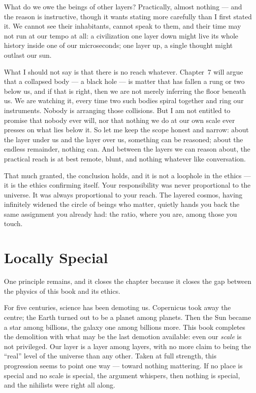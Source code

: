 \documentclass[fontsize=11pt,paper=a4,pagesize=auto,parskip=half-]{scrbook}
\begin{document}
What do we owe the beings of other layers? Practically, almost nothing --- and the reason is instructive, though it wants stating more carefully than I first stated it. We cannot see their inhabitants, cannot speak to them, and their time may not run at our tempo at all: a civilization one layer down might live its whole history inside one of our microseconds; one layer up, a single thought might outlast our sun.

What I should not say is that there is no reach whatever. Chapter~7 will argue that a collapsed body --- a black hole --- is matter that has fallen a rung or two below us, and if that is right, then we are not merely inferring the floor beneath us. We are watching it, every time two such bodies spiral together and ring our instruments. Nobody is arranging those collisions. But I am not entitled to promise that nobody ever will, nor that nothing we do at our own scale ever presses on what lies below it. So let me keep the scope honest and narrow: about the layer under us and the layer over us, something can be reasoned; about the endless remainder, nothing can. And between the layers we can reason about, the practical reach is at best remote, blunt, and nothing whatever like conversation.

That much granted, the conclusion holds, and it is not a loophole in the ethics --- it is the ethics confirming itself. Your responsibility was never proportional to the universe. It was always proportional to your reach. The layered cosmos, having infinitely widened the circle of beings who matter, quietly hands you back the same assignment you already had: the ratio, where you are, among those you touch.

\section{Locally Special}

One principle remains, and it closes the chapter because it closes the gap between the physics of this book and its ethics.

For five centuries, science has been demoting us. Copernicus took away the centre; the Earth turned out to be a planet among planets. Then the Sun became a star among billions, the galaxy one among billions more. This book completes the demolition with what may be the last demotion available: even our \emph{scale} is not privileged. Our layer is a layer among layers, with no more claim to being the ``real'' level of the universe than any other. Taken at full strength, this progression seems to point one way --- toward nothing mattering. If no place is special and no scale is special, the argument whispers, then nothing is special, and the nihilists were right all along.
\end{document}
